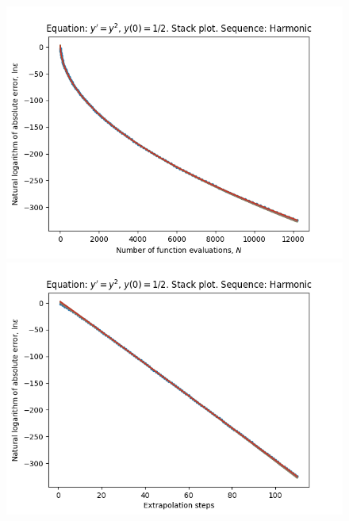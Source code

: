 \begin{figure}[H]
\centering
\begin{minipage}{0.45\textwidth}
\centering
\includegraphics[scale=0.45]{../results/emr_plots/singularity_0_hp_harmonic_stack.png}
\end{minipage}
\begin{minipage}{0.45\textwidth}
\centering
\includegraphics[scale=0.45]{../results/emr_plots/singularity_0_hp_harmonic_steps_stack.png}
\end{minipage}
\end{figure}

